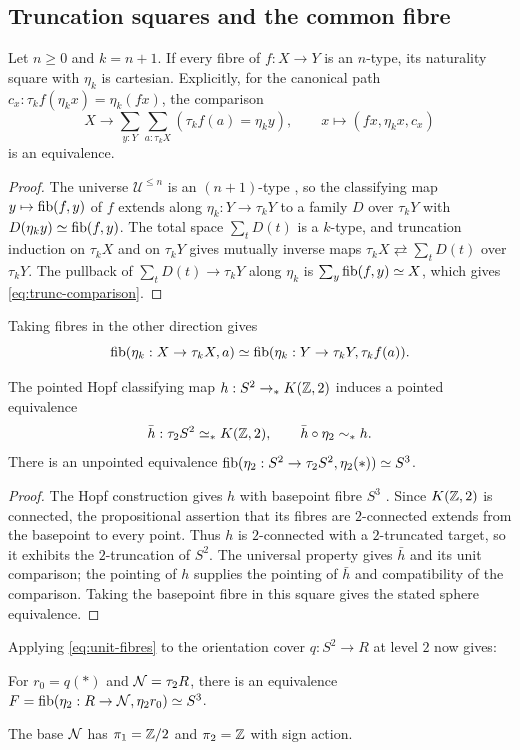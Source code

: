 \subsection{Truncation squares and the common fibre}\label{sec:truncation}

\begin{theorem}\label{thm:trunc-square}
Let $n\geq0$ and $k=n+1$. If every fibre of $f:X\to Y$ is an $n$-type, its naturality square with $\eta_k$ is cartesian. Explicitly, for the canonical path $c_x:\tau_kf(\eta_kx)=\eta_k(fx)$, the comparison
\begin{equation}\label{eq:trunc-comparison}
X\longrightarrow\sum_{y:Y}\sum_{a:\tau_kX}(\tau_kf(a)=\eta_ky),
\qquad x\longmapsto(fx,\eta_kx,c_x)
\end{equation}
is an equivalence.
\end{theorem}
\begin{proof}
The universe $\mathcal U^{\leq n}$ is an $(n+1)$-type \cite[\S7.1]{hott}, so the classifying map $y\mapsto\operatorname{fib}(f,y)$ of $f$ extends along $\eta_k:Y\to\tau_kY$ to a family $D$ over $\tau_kY$ with $D(\eta_ky)\simeq\operatorname{fib}(f,y)$. The total space $\sum_tD(t)$ is a $k$-type, and truncation induction on $\tau_kX$ and on $\tau_kY$ gives mutually inverse maps $\tau_kX\rightleftarrows\sum_tD(t)$ over $\tau_kY$. The pullback of $\sum_tD(t)\to\tau_kY$ along $\eta_k$ is $\sum_y\operatorname{fib}(f,y)\simeq X$, which gives \eqref{eq:trunc-comparison}.
\end{proof}
Taking fibres in the other direction gives
\begin{equation}\label{eq:unit-fibres}
\operatorname{fib}(\eta_k:X\to\tau_kX,a)\simeq
\operatorname{fib}(\eta_k:Y\to\tau_kY,\tau_kf(a)).
\end{equation}

\begin{lemma}\label{lem:hopf-reflection}
The pointed Hopf classifying map $h:S^2\to_*K(\mathbb Z,2)$ induces a pointed equivalence
\[
\bar h:\tau_2S^2\simeq_* K(\mathbb Z,2),\qquad \bar h\circ\eta_2\sim_*h.
\]
There is an unpointed equivalence
$\operatorname{fib}(\eta_2:S^2\to\tau_2S^2,\eta_2(*))\simeq S^3$.
\end{lemma}
\begin{proof}
The Hopf construction gives $h$ with basepoint fibre $S^3$ \cite[\S8.5]{hott}. Since $K(\mathbb Z,2)$ is connected, the propositional assertion that its fibres are $2$-connected extends from the basepoint to every point. Thus $h$ is $2$-connected with a $2$-truncated target, so it exhibits the $2$-truncation of $S^2$. The universal property gives $\bar h$ and its unit comparison; the pointing of $h$ supplies the pointing of $\bar h$ and compatibility of the comparison. Taking the basepoint fibre in this square gives the stated sphere equivalence.
\end{proof}
Applying \eqref{eq:unit-fibres} to the orientation cover $q:S^2\to R$ at level $2$ now gives:
\begin{proposition}\label{prop:common-F}
For $r_0=q(*)$ and $\mathcal N=\tau_2R$, there is an equivalence
$F=\operatorname{fib}(\eta_2:R\to\mathcal N,\eta_2r_0)\simeq S^3$.
\end{proposition}
The base $\mathcal N$ has $\pi_1=\mathbb Z/2$ and $\pi_2=\mathbb Z$ with sign action.


